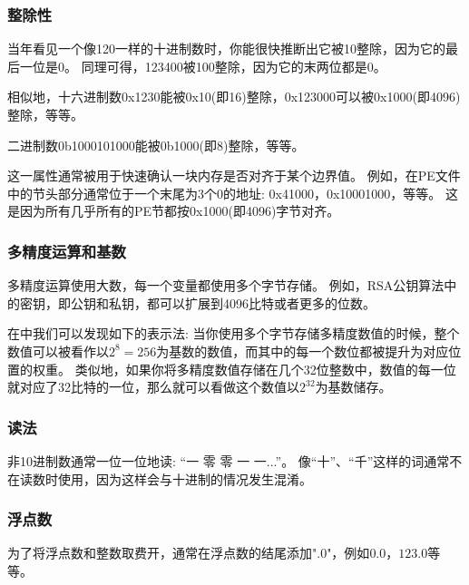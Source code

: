 \subsubsection{整除性}

当年看见一个像120一样的十进制数时，你能很快推断出它被10整除，因为它的最后一位是0。
同理可得，123400被100整除，因为它的末两位都是0。

相似地，十六进制数0x1230能被0x10(即16)整除，0x123000可以被0x1000(即4096)整除，等等。

二进制数0b1000101000能被0b1000(即8)整除，等等。

这一属性通常被用于快速确认一块内存是否对齐于某个边界值。
例如，在\ac{PE}文件中的节头部分通常位于一个末尾为3个0的地址: 0x41000，0x10001000，等等。
这是因为所有几乎所有的\ac{PE}节都按0x1000(即4096)字节对齐。

\subsubsection{多精度运算和基数}

多精度运算使用大数，每一个变量都使用多个字节存储。
例如，RSA公钥算法中的密钥，即公钥和私钥，都可以扩展到4096比特或者更多的位数。

在中我们可以发现如下的表示法: 当你使用多个字节存储多精度数值的时候，整个数值可以被看作以$2^8=256$为基数的数值，而其中的每一个数位都被提升为对应位置的权重。
类似地，如果你将多精度数值存储在几个32位整数中，数值的每一位就对应了32比特的一位，那么就可以看做这个数值以$2^{32}$为基数储存。

\subsubsection{读法}

非10进制数通常一位一位地读: “一 零 零 一 一...”。
像“十”、“千”这样的词通常不在读数时使用，因为这样会与十进制的情况发生混淆。

\subsubsection{浮点数}

为了将浮点数和整数取费开，通常在浮点数的结尾添加".0"，例如$0.0$，$123.0$等等。
